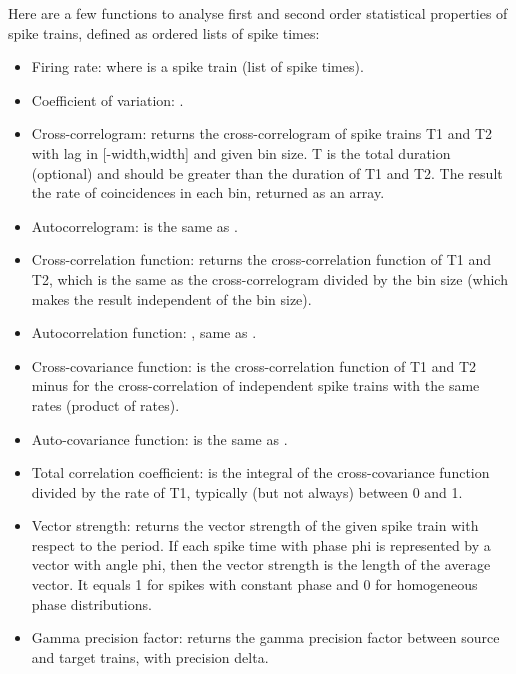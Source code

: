 \documentclass[letterpaper,10pt,english]{manual}
\begin{document}
Here are a few functions to analyse first and second order statistical properties
of spike trains, defined as ordered lists of spike times:
\begin{itemize}
\item {} 
Firing rate:  where  is a spike train (list of spike times).

\item {} 
Coefficient of variation: .

\item {} 
Cross-correlogram:  returns
the cross-correlogram of spike trains T1 and T2 with lag in {[}-width,width{]} and given bin size.
T is the total duration (optional) and should be greater than the duration of T1 and T2.
The result the rate of coincidences in each bin, returned as an array.

\item {} 
Autocorrelogram:  is the same as
.

\item {} 
Cross-correlation function:  returns the cross-correlation
function of T1 and T2, which is the same as the cross-correlogram divided by the bin size (which makes the
result independent of the bin size).

\item {} 
Autocorrelation function: , same as
.

\item {} 
Cross-covariance function:  is the cross-correlation
function of T1 and T2 minus for the cross-correlation of independent spike trains with the same rates
(product of rates).

\item {} 
Auto-covariance function:  is the same as
.

\item {} 
Total correlation coefficient:  is
the integral of the cross-covariance function divided by the rate of T1, typically (but not
always) between 0 and 1.

\item {} 
Vector strength:  returns the vector strength of the given
spike train with respect to the period. If each spike time with phase phi is represented by
a vector with angle phi, then the vector strength is the length of the average vector.
It equals 1 for spikes with constant phase and 0 for homogeneous phase distributions.

\item {} 
Gamma precision factor:  returns the gamma precision
factor between source and target trains, with precision delta.

\end{itemize}
\end{document}
